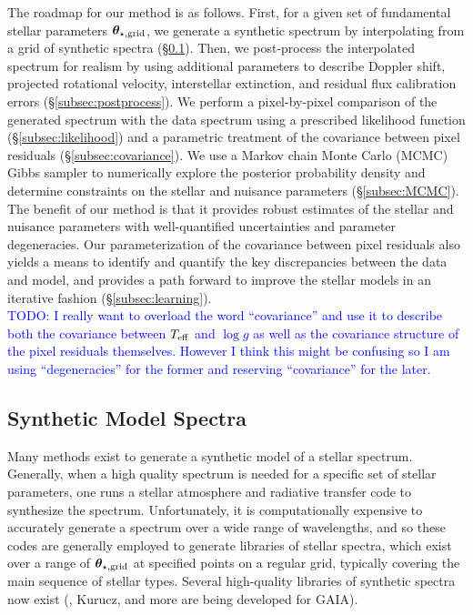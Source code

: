 \documentclass[preprint]{aastex} %
\newcommand{\vt}{ {\bm \theta}}
\newcommand{\vg}{\vt_{\star, {\rm grid}}}
\newcommand{\todo}[1]{ \textcolor{Blue}{\\TODO: #1}}
\begin{document}
The roadmap for our method is as follows.
 First, for a given set of fundamental stellar parameters $\vg$, we generate a synthetic
 spectrum by interpolating from a grid of synthetic spectra (\S\ref{subsec:synthetic}). 
Then, we post-process the interpolated spectrum for realism by using additional
 parameters to describe Doppler shift, projected rotational velocity,
 interstellar extinction, and residual flux calibration errors
 (\S\ref{subsec:postprocess}). 
We perform a pixel-by-pixel comparison of the generated spectrum with the
 data spectrum using a prescribed likelihood function
 (\S\ref{subsec:likelihood}) and a parametric treatment of the covariance
 between pixel residuals (\S\ref{subsec:covariance}). 
We use a Markov chain Monte Carlo (MCMC) Gibbs sampler to numerically explore
the posterior probability density and determine constraints on the stellar
and nuisance parameters (\S\ref{subsec:MCMC}). 
The benefit of our method is that it provides robust estimates of the stellar and nuisance
parameters with well-quantified uncertainties and parameter degeneracies. 
Our parameterization of the covariance between pixel residuals also yields a means to identify
 and quantify the key discrepancies between the data and model, and provides a path forward to 
 improve the stellar models in an iterative fashion (\S\ref{subsec:learning}).
 \todo{I really want to overload the word ``covariance'' and use it to describe both the covariance between $T_{\rm eff}$ and $\log g$ as well as the covariance structure of the pixel residuals themselves. However I think this might be confusing so I am using ``degeneracies'' for the former and reserving ``covariance'' for the later.}

\subsection{Synthetic Model Spectra}
\label{subsec:synthetic}
Many methods exist to generate a synthetic model of a stellar spectrum. Generally, when
a high quality spectrum is needed for a specific set of stellar parameters, one
runs a stellar atmosphere and radiative transfer code to synthesize the
spectrum. Unfortunately, it is computationally expensive to accurately generate
a spectrum over a wide range of wavelengths, and so these codes are generally
employed to generate libraries of stellar spectra, which exist over a range of
$\vg$ at specified points on a regular grid, typically covering the main sequence of stellar
types. Several high-quality libraries of synthetic spectra now exist
(\citealt{hwd+13}, Kurucz, and more are being developed for GAIA).  
\end{document}
